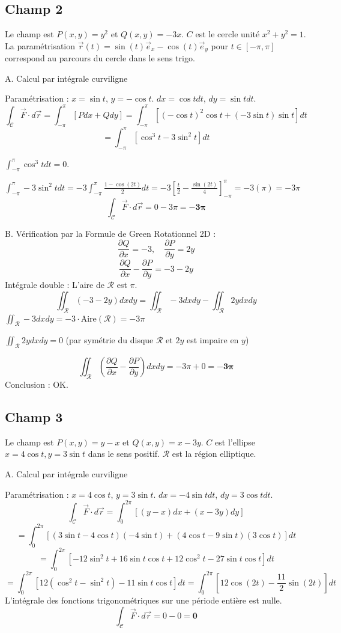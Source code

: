 \documentclass[french]{yLectureNote}
\renewcommand{\vec}{\overrightarrow}
\begin{document}
\subsection{Champ 2}
Le champ est $P(x,y) = y^2$ et $Q(x,y) = -3x$. $C$ est le cercle unité $x^2+y^2=1$. La paramétrisation $\vec{r}(t)=\sin(t)\vec{e}_{x}-\cos(t)\vec{e}_{y}$ pour $t \in [-\pi, \pi]$ correspond au parcours du cercle dans le sens trigo.

A. Calcul par intégrale curviligne

Paramétrisation : $x=\sin t$, $y=-\cos t$. $dx=\cos t dt$, $dy=\sin t dt$.
$$
\int_{\mathcal{C}}\vec{F}\cdot d\vec{r} = \int_{-\pi}^{\pi} [P dx + Q dy] = \int_{-\pi}^{\pi} [(-\cos t)^2 \cos t + (-3\sin t) \sin t] dt
$$
$$
= \int_{-\pi}^{\pi} [\cos^3 t - 3\sin^2 t] dt
$$

$\int_{-\pi}^{\pi} \cos^3 t dt = 0$.

$\int_{-\pi}^{\pi} -3\sin^2 t dt = -3 \int_{-\pi}^{\pi} \frac{1-\cos(2t)}{2} dt = -3 \left[\frac{t}{2} - \frac{\sin(2t)}{4}\right]_{-\pi}^{\pi} = -3(\pi) = -3\pi$
$$
\int_{\mathcal{C}}\vec{F}\cdot d\vec{r} = 0 - 3\pi = \mathbf{-3\pi}
$$

B. Vérification par la Formule de Green
Rotationnel 2D :
$$
\frac{\partial Q}{\partial x} = -3, \quad \frac{\partial P}{\partial y} = 2y
$$
$$
\frac{\partial Q}{\partial x}-\frac{\partial P}{\partial y} = -3 - 2y
$$
Intégrale double : L'aire de $\mathcal{R}$ est $\pi$.
$$
\iint_{\mathcal{R}} (-3 - 2y) dx dy = \iint_{\mathcal{R}} -3 dx dy - \iint_{\mathcal{R}} 2y dx dy
$$
$\iint_{\mathcal{R}} -3 dx dy = -3 \cdot \text{Aire}(\mathcal{R}) = -3\pi$

$\iint_{\mathcal{R}} 2y dx dy = 0$ (par symétrie du disque $\mathcal{R}$ et $2y$
est impaire en $y$)

$$
\iint_{\mathcal{R}}\left(\frac{\partial Q}{\partial x} - \frac{\partial P}{\partial y}\right) dx dy = -3\pi + 0 = \mathbf{-3\pi}
$$
Conclusion : OK.
\subsection{Champ 3}

Le champ est $P(x,y) = y-x$ et $Q(x,y) = x-3y$. $C$ est l'ellipse $x=4\cos t, y=3\sin t$ dans le sens positif. $\mathcal{R}$ est la région elliptique.

A. Calcul par intégrale curviligne

Paramétrisation : $x=4\cos t$, $y=3\sin t$. $dx=-4\sin t dt$, $dy=3\cos t dt$.
$$
\int_{\mathcal{C}}\vec{F}\cdot d\vec{r} = \int_{0}^{2\pi} [(y-x) dx + (x-3y) dy]
$$
$$
= \int_{0}^{2\pi} [(3\sin t - 4\cos t)(-4\sin t) + (4\cos t - 9\sin t)(3\cos t)] dt
$$
$$
= \int_{0}^{2\pi} [-12\sin^2 t + 16\sin t \cos t + 12\cos^2 t - 27\sin t \cos t] dt
$$
$$
= \int_{0}^{2\pi} [12(\cos^2 t - \sin^2 t) - 11\sin t \cos t] dt = \int_{0}^{2\pi} [12\cos(2t) - \frac{11}{2}\sin(2t)] dt
$$
L'intégrale des fonctions trigonométriques sur une période entière est nulle.
$$
\int_{\mathcal{C}}\vec{F}\cdot d\vec{r} = 0 - 0 = \mathbf{0}
$$
\end{document}
